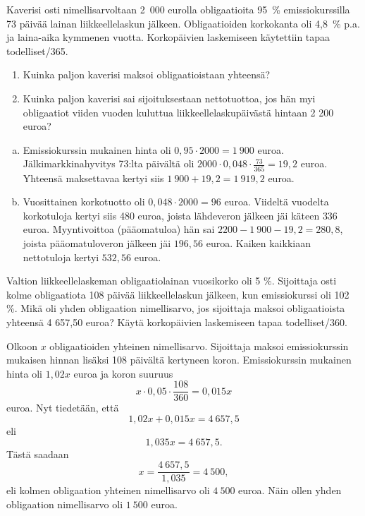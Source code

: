 \documentclass{article}\usepackage[]{graphicx}\usepackage[]{color}
\begin{document}
\begin{question} Kaverisi osti nimellisarvoltaan 2~000 eurolla obligaatioita 95~\% emissiokurssilla 73 päivää lainan liikkeellelaskun jälkeen. Obligaatioiden korkokanta oli 4{,}8~\% p.a. ja laina-aika kymmenen vuotta. Korkopäivien laskemiseen käytettiin tapaa todelliset/365.
  \begin{enumerate}
    \item Kuinka paljon kaverisi maksoi obligaatioistaan yhteensä?
    \item Kuinka paljon kaverisi sai sijoituksestaan nettotuottoa, jos hän myi obligaatiot viiden vuoden kuluttua liikkeellelaskupäivästä hintaan 2 200 euroa?
  \end{enumerate} 
\end{question}
\begin{solution}
  \begin{enumerate}[(a)]
    \item Emissiokurssin mukainen hinta oli \(0,95\cdot2000 = 1~900\) euroa. Jälkimarkkinahyvitys 73:lta päivältä oli \(2000\cdot0,048\cdot\frac{73}{365} = 19{,}2\) euroa. Yhteensä maksettavaa kertyi siis \(1~900 + 19{,}2 = 1~919{,}2\) euroa.
    \item 
      Vuosittainen korkotuotto oli \(0,048\cdot2000 = 96\) euroa. Viideltä vuodelta korkotuloja kertyi siis 480 euroa, joista lähdeveron jälkeen jäi käteen \(336\) euroa. Myyntivoittoa (pääomatuloa) hän sai \(2200 - 1~900 - 19{,}2 = 280{,}8\), joista pääomatuloveron jälkeen jäi \(196{,}56\) euroa. Kaiken kaikkiaan nettotuloja kertyi \(532{,}56\) euroa. 
  \end{enumerate}
\end{solution}

\begin{question} Valtion liikkeellelaskeman obligaatiolainan vuosikorko oli 5 \%. Sijoittaja osti kolme obligaatiota 108 päivää liikkeellelaskun jälkeen, kun emissiokurssi oli 102 \%. Mikä oli yhden obligaation nimellisarvo, jos sijoittaja maksoi obligaatioista yhteensä 4 657{,}50 euroa? Käytä korkopäivien laskemiseen tapaa todelliset/360.
\end{question}
\begin{solution}

  Olkoon \(x\) obligaatioiden yhteinen nimellisarvo. Sijoittaja maksoi emissiokurssin mukaisen hinnan lisäksi 108 päivältä kertyneen koron. Emissiokurssin mukainen hinta oli \(1,02x\) euroa ja koron suuruus
  \[
  x\cdot0,05\cdot\frac{108}{360} = 0{,}015x
  \]
euroa. Nyt tiedetään, että
\[
  1,02x + 0{,}015x = 4~657{,}5
\]
eli
\[
  1{,}035x = 4~657{,}5.
\]
Tästä saadaan
\[
  x = \frac{4~657{,}5}{1{,}035} = 4~500,
\]
eli kolmen obligaation yhteinen nimellisarvo oli \(4~500\) euroa. Näin ollen yhden obligaation nimellisarvo oli \(1~500\) euroa.
\end{solution}
\end{document}
